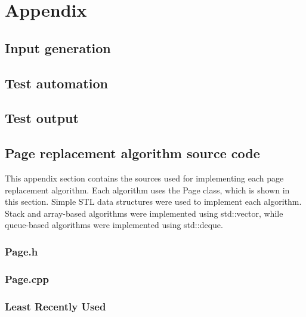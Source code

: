 \documentclass[paper=a4, fontsize=11pt]{scrartcl} %
\numberwithin{equation}{section} %
\numberwithin{figure}{section} %
\numberwithin{table}{section} %
\begin{document}
\section{Appendix}


\subsection{Input generation} \label{createInputs}



\subsection{Test automation} \label{runTests}



\subsection{Test output} \label{output}


\subsection{Page replacement algorithm source code}
This appendix section contains the sources used for implementing each page replacement algorithm. Each algorithm uses the Page class, which is shown in this section. Simple STL data structures were used to implement each algorithm. Stack and array-based algorithms were implemented using std::vector, while queue-based algorithms were implemented using std::deque. 

\subsubsection{Page.h}

\subsubsection{Page.cpp}


\subsubsection{Least Recently Used}

\end{document}
